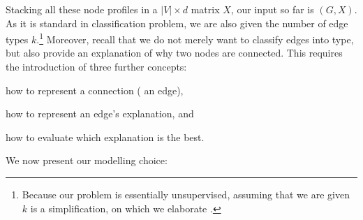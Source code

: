 Stacking all these node profiles in a $|V| \times d$ matrix $X$, our input so far is $(G, X)$. As it
is standard in classification problem, we are also given the number of edge types
$k$.\footnote{Because our problem is essentially unsupervised, assuming that we are given $k$ is a
simplification, on which we elaborate .} Moreover, recall that we do not
merely want to classify edges into type, but also provide an explanation of why two nodes are
connected. This requires the introduction of three further concepts:
\begin{enumerate*}[1)]
\item how to represent a connection (\ie{} an edge),
\item how to represent an edge's explanation, and
\item how to evaluate which explanation is the best.
\end{enumerate*}
We now present our modelling choice:

